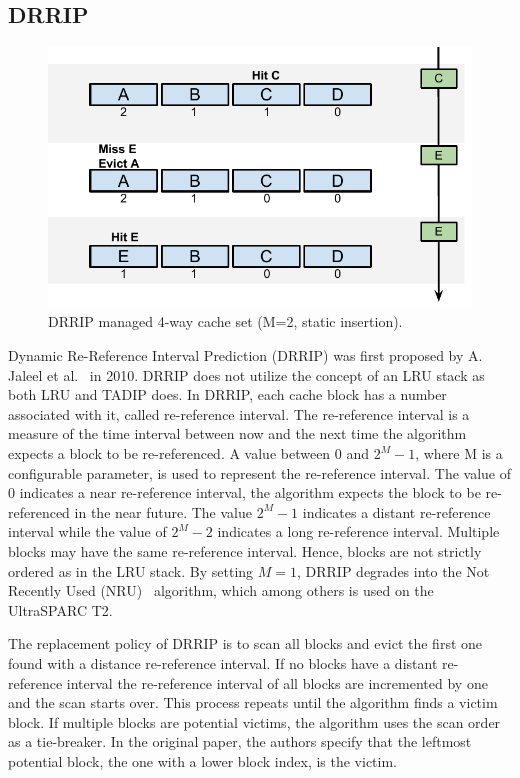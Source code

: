 \subsection{DRRIP}
\label{sec:algorithms:drrip}

\begin{figure}[ht]
    \centering
    \includegraphics[width=\textwidth]{figures/algorithms/DRRIP}
    \caption{DRRIP managed 4-way cache set (M=2, static insertion).}
    \label{fig:algorithms:drrip_example}
\end{figure}

Dynamic Re-Reference Interval Prediction (DRRIP) was first proposed by A. Jaleel et al.~\cite{Jaleel2010} in 2010.
DRRIP does not utilize the concept of an LRU stack as both LRU and TADIP does.
In DRRIP, each cache block has a number associated with it, called re-reference interval.
The re-reference interval is a measure of the time interval between now and the next time the algorithm expects a block to be re-referenced.
A value between 0 and $2^M - 1$, where M is a configurable parameter, is used to represent the re-reference interval.
The value of 0 indicates a near re-reference interval, the algorithm expects the block to be re-referenced in the near future.
The value $2^M - 1$ indicates a distant re-reference interval while the value of $2^M - 2$ indicates a long re-reference interval.
Multiple blocks may have the same re-reference interval. 
Hence, blocks are not strictly ordered as in the LRU stack.
By setting $M=1$, DRRIP degrades into the Not Recently Used (NRU)~\cite{Microsystems2007} algorithm, which among others is used on the UltraSPARC T2.

The replacement policy of DRRIP is to scan all blocks and evict the first one found with a distance re-reference interval.
If no blocks have a distant re-reference interval the re-reference interval of all blocks are incremented by one and the scan starts over.
This process repeats until the algorithm finds a victim block.
If multiple blocks are potential victims, the algorithm uses the scan order as a tie-breaker.
In the original paper, the authors specify that the leftmost potential block, the one with a lower block index, is the victim.


